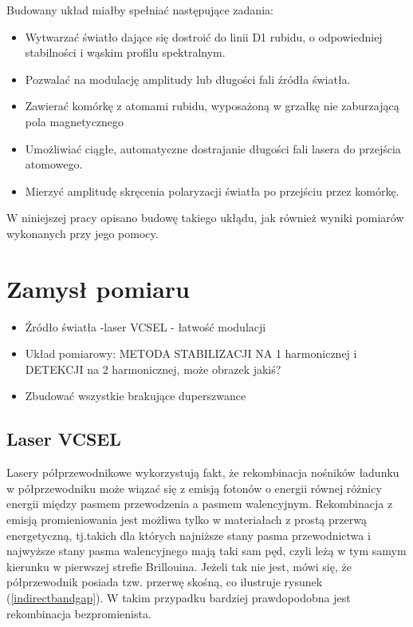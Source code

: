 \documentclass[a4paper,10pt]{article}
\begin{document}
Budowany układ miałby spełniać następujące zadania:
\begin{itemize}
 \item Wytwarzać światło dające się dostroić do linii D1 rubidu, o odpowiedniej stabilności i wąskim profilu spektralnym.
 \item Pozwalać na modulację amplitudy lub długości fali źródła światła.
 \item Zawierać komórkę z atomami rubidu, wyposażoną w grzałkę nie zaburzającą pola magnetycznego
 \item Umożliwiać ciągłe, automatyczne dostrajanie długości fali lasera do przejścia atomowego. 
 \item Mierzyć amplitudę skręcenia polaryzacji światła po przejściu przez komórkę.
\end{itemize}

W niniejszej pracy opisano budowę takiego ukłądu, jak również wyniki pomiarów wykonanych przy jego pomocy.


\section{Zamysł pomiaru}
\begin{itemize}
 \item Źródło światła -laser VCSEL - łatwość modulacji
 \item Układ pomiarowy: METODA STABILIZACJI NA 1 harmonicznej i DETEKCJI na 2 harmonicznej, może obrazek jakiś?
 \item Zbudować wszystkie brakujące duperszwance
\end{itemize}



\subsection{Laser VCSEL}  %

Lasery półprzewodnikowe wykorzystują fakt, że rekombinacja nośników ładunku w półprzewodniku może wiązać się z emisją fotonów o energii równej różnicy energii między pasmem przewodzenia a pasmem walencyjnym. Rekombinacja z emisją promieniowania jest możliwa tylko w materiałach z prostą przerwą energetyczną, tj.takich dla których najniższe stany pasma przewodnictwa i najwyższe stany pasma walencyjnego mają taki sam pęd, czyli leżą w tym samym kierunku w pierwszej strefie Brillouina. Jeżeli tak nie jest, mówi się, że półprzewodnik posiada tzw. przerwę skośną, co ilustruje rysunek (\ref{indirectbandgap}). W takim przypadku bardziej prawdopodobna jest rekombinacja bezpromienista.
\end{document}
